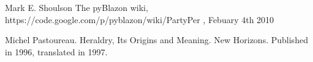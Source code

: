 \begin{thebibliography}{100}

  	Mark E. Shoulson
 	The pyBlazon wiki, 
 	https://code.google.com/p/pyblazon/wiki/PartyPer , 
 	Febuary 4th 2010


	Michel Pastoureau. 
	Heraldry, Its Origins and Meaning.
	New Horizons. 
	Published in 1996, translated in 1997.











\end{thebibliography}